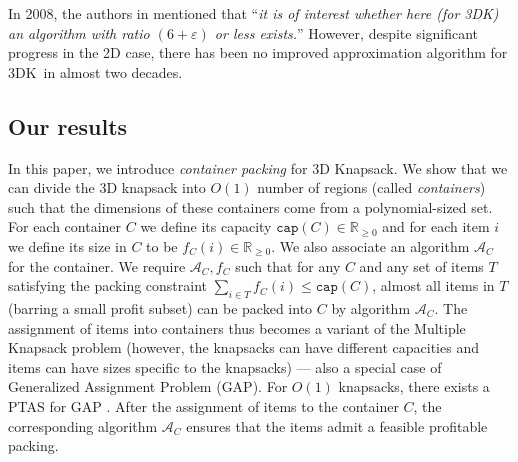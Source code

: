 \documentclass[10pt,a4paper]{amsart}
\newcommand{\eps}{\varepsilon}
\newcommand{\AM}{\mathcal{A}}
\newcommand{\tdk}{\textsc{3DK}}
\theoremstyle{definition}
\begin{document}
In 2008, the authors in \cite{3d-knapsack} mentioned that ``{\em it is of interest whether here (for \tdk) an algorithm with ratio $(6+\eps)$ or less exists.}''
However, despite significant progress in the 2D case, there has been no improved approximation algorithm for \tdk~in almost two decades. 
\subsection{Our results}
In this paper, we introduce {\em container packing} for 3D Knapsack. We show that we can divide the 3D knapsack into $O(1)$ number of regions  (called {\em containers}) such that the dimensions of these containers come from a polynomial-sized set. 
For each container $C$ we define its capacity  $\mathtt{cap}(C) \in \mathbb{R}_{\ge 0}$ and for each item $i$ we define its size in $C$ to be $f_C(i) \in \mathbb{R}_{\ge 0}$. 
We also associate an algorithm $\AM_C$ for the container.
We require $\AM_C, f_C$  such that for any $C$ and any set of items $T$ satisfying the packing constraint $\sum_{i\in T} f_C(i) \le \mathtt{cap}(C)$, almost all items in $T$ (barring a small profit subset) can be packed into $C$ by algorithm $\AM_C$. 
The assignment of items into containers thus becomes a variant of the Multiple Knapsack problem (however, the knapsacks can have different capacities and items can have sizes specific to the knapsacks) --- also a special case of Generalized Assignment Problem (GAP). 
For $O(1)$ knapsacks, there exists a PTAS for GAP \cite{2dks-Lpacking}.
After the assignment of items to the container $C$, the corresponding algorithm $\AM_C$ ensures that the items admit a feasible profitable packing.
\end{document}
